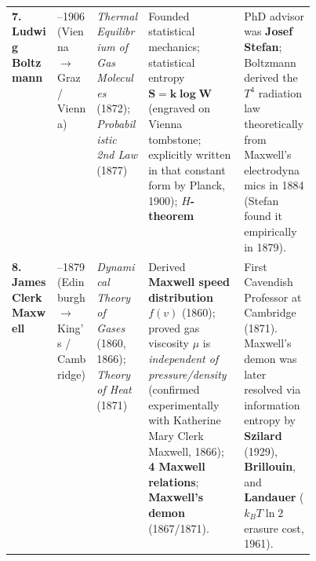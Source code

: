 \begin{quicksheet}
{\begin{tabularx}{\linewidth}{@{}>{\raggedright\arraybackslash}p{0.15\linewidth} >{\raggedright\arraybackslash}p{0.13\linewidth} >{\raggedright\arraybackslash}p{0.17\linewidth} X X@{}}
\textbf{7. Ludwig Boltzmann} & 1844--1906 (Vienna $\to$ Graz / Vienna) & \emph{Thermal Equilibrium of Gas Molecules} (1872); \emph{Probabilistic 2nd Law} (1877) & Founded statistical mechanics; statistical entropy $\mathbf{S = k \log W}$ (engraved on Vienna tombstone; explicitly written in that constant form by Planck, 1900); \textbf{$H$-theorem} & PhD advisor was \textbf{Josef Stefan}; Boltzmann derived the $T^4$ radiation law theoretically from Maxwell's electrodynamics in 1884 (Stefan found it empirically in 1879).\\
\textbf{8. James Clerk Maxwell} & 1831--1879 (Edinburgh $\to$ King's / Cambridge) & \emph{Dynamical Theory of Gases} (1860, 1866); \emph{Theory of Heat} (1871) & Derived \textbf{Maxwell speed distribution} $f(v)$ (1860); proved gas viscosity $\mu$ is \emph{independent of pressure/density} (confirmed experimentally with Katherine Mary Clerk Maxwell, 1866); \textbf{4 Maxwell relations}; \textbf{Maxwell's demon} (1867/1871). & First Cavendish Professor at Cambridge (1871). Maxwell's demon was later resolved via information entropy by \textbf{Szilard} (1929), \textbf{Brillouin}, and \textbf{Landauer} ($k_B T\ln 2$ erasure cost, 1961).\\\bottomrule
\end{tabularx}}


\end{quicksheet}
